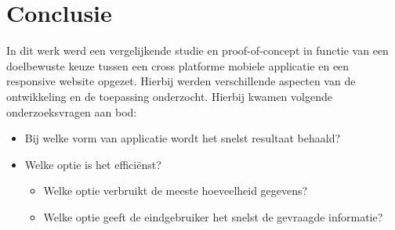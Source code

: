 
\chapter{Conclusie}
\label{ch:conclusie}








In dit werk werd een vergelijkende studie en proof-of-concept in functie van een doelbewuste keuze tussen een
cross platforme mobiele applicatie en een responsive website opgezet. Hierbij werden verschillende aspecten van de ontwikkeling
en de toepassing onderzocht. Hierbij kwamen volgende onderzoeksvragen aan bod:

\begin{itemize}
  \item{Bij welke vorm van applicatie wordt het snelst resultaat behaald?}
  \item{Welke optie is het efficiënst?}
  \begin{itemize}
    \item{Welke optie verbruikt de meeste hoeveelheid gegevens?}
    \item{Welke optie geeft de eindgebruiker het snelst de gevraagde informatie?}
  \end{itemize}
\end{itemize}

